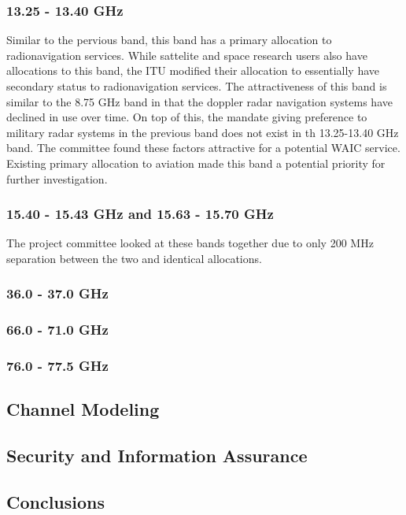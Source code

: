 \subsubsection{13.25 - 13.40 GHz}
Similar to the pervious band, this band has a primary allocation to radionavigation services. While sattelite and space research users also have allocations to this band, the ITU modified their allocation to essentially have secondary status to radionavigation services. The attractiveness of this band is similar to the 8.75 GHz band in that the doppler radar navigation systems have declined in use over time. On top of this, the mandate giving preference to military radar systems in the previous band does not exist in th 13.25-13.40 GHz band. The committee found these factors attractive for a potential WAIC service. Existing primary allocation to aviation made this band a potential priority for further investigation.

\subsubsection{15.40 - 15.43 GHz and 15.63 - 15.70 GHz}
The project committee looked at these bands together due to only 200 MHz separation between the two and identical allocations. 

\subsubsection{36.0 - 37.0 GHz}

\subsubsection{66.0 - 71.0 GHz}

\subsubsection{76.0 - 77.5 GHz}
 
\subsection{Channel Modeling}

\subsection{Security and Information Assurance}

\subsection{Conclusions}
 
